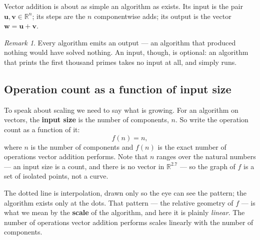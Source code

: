 \documentclass[11pt]{article}
\theoremstyle{plain}
\theoremstyle{definition}
\theoremstyle{remark}
\newtheorem*{rmk}{Remark}
\newcommand{\R}{\mathbb{R}}
\newcommand{\vc}[1]{\mathbf{#1}}
\begin{document}
\noindent Vector addition is about as simple an algorithm as exists. Its input
is the pair $\vc{u},\vc{v}\in\R^{n}$; its steps are the $n$ componentwise adds;
its output is the vector $\vc{w}=\vc{u}+\vc{v}$.

\begin{rmk}
Every algorithm emits an output --- an algorithm that produced nothing would
have solved nothing. An input, though, is optional: an algorithm that prints the
first thousand primes takes no input at all, and simply runs.
\end{rmk}

\subsection{Operation count as a function of input size}
To speak about scaling we need to say what is growing. For an algorithm on
vectors, the \textbf{input size} is the number of components, $n$. So write the
operation count as a function of it:
\[
  f(n) = n ,
\]
where $n$ is the number of components and $f(n)$ is the exact number of
operations vector addition performs. Note that $n$ ranges over the natural
numbers --- an input size is a count, and there is no vector in $\R^{2.7}$ ---
so the graph of $f$ is a set of isolated points, not a curve.

\begin{center}
\end{center}

\noindent The dotted line is interpolation, drawn only so the eye can see the
pattern; the algorithm exists only at the dots. That pattern --- the relative
geometry of $f$ --- is what we mean by the \textbf{scale} of the algorithm, and
here it is plainly \emph{linear}. The number of operations vector addition
performs scales linearly with the number of components.
\end{document}
